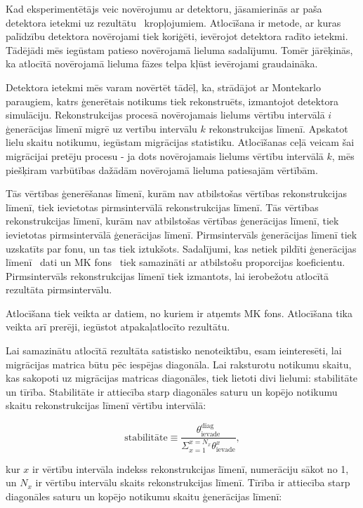 Kad eksperimentētājs veic novērojumu ar detektoru, jāsamierinās ar paša detektora ietekmi uz rezultātu \textendash\ kropļojumiem. \gls{Atlocīšana} ir metode, ar kuras palīdzību detektora novērojami tiek koriģēti, ievērojot detektora radīto ietekmi. Tādējādi mēs iegūstam patieso novērojamā lieluma sadalījumu. Tomēr jārēķinās, ka atlocītā novērojamā lieluma fāzes telpa kļūst ievērojami graudaināka. 

Detektora ietekmi mēs varam novērtēt tādēļ, ka, strādājot ar Montekarlo paraugiem, katrs ģenerētais notikums tiek rekonstruēts, izmantojot detektora simulāciju. Rekonstrukcijas procesā novērojamais lielums vērtību intervālā $i$ ģenerācijas līmenī migrē uz vertību intervālu $k$ rekonstrukcijas līmenī. Apskatot lielu skaitu notikumu, iegūstam migrācijas statistiku. Atlocīšanas ceļā veicam šai migrācijai pretēju procesu - ja dots novērojamais lielums vērtību intervālā $k$, mēs piešķiram varbūtības dažādām novērojamā lieluma patiesajām vērtībām.

Tās \pullangle vērtības ģenerēšanas līmenī, kurām nav atbilstošas vērtības rekonstrukcijas līmenī, tiek ievietotas \gls{pirmsintervālā} rekonstrukcijas līmenī. Tās \pullangle vērtības rekonstrukcijas līmenī, kurām nav atbilstošas vērtības ģenerācijas līmenī, tiek ievietotas pirmsintervālā ģenerācijas līmenī. Pirmsintervāls ģenerācijas līmenī tiek uzskatīts par fonu, un tas tiek iztukšots. Sadalījumi, kas netiek pildīti ģenerācijas līmenī \textendash\ dati un MK fons \testendash\ tiek samazināti ar atbilstošu proporcijas koeficientu. Pirmsintervāls rekonstrukcijas līmenī tiek izmantots, lai ierobežotu atlocītā rezultāta pirmsintervālu. 

Atlocīšana tiek veikta ar datiem, no kuriem ir atņemts MK fons. Atlocīšana tika veikta arī prerēji, iegūstot atpakaļatlocīto rezultātu. 

Lai samazinātu atlocītā rezultāta satistisko nenoteiktību, esam ieinteresēti, lai migrācijas matrica būtu pēc iespējas diagonāla. Lai raksturotu notikumu skaitu, kas sakopoti uz migrācijas matricas diagonāles, tiek lietoti divi lielumi: stabilitāte un tīrība. Stabilitāte ir attiecība starp diagonāles saturu un kopējo notikumu skaitu rekonstrukcijas līmenī vērtību intervālā:

\begin{equation}
  \text{stabilitāte}\equiv\frac{\theta^{\text{diag}}_{\text{ievade}}}{\Sigma_{x=1}^{x=N_{x}}\theta^{x}_{\text{ievade}}},
\end{equation}

\noindent kur $x$ ir vērtību intervāla indekss rekonstrukcijas līmenī, numerāciju sākot no 1, un $N_{x}$ ir vērtību intervālu skaits rekonstrukcijas līmenī. Tīrība ir attiecība starp diagonāles saturu un kopējo notikumu skaitu ģenerācijas līmenī:

